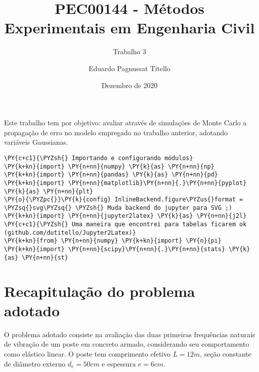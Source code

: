 

\author{Eduardo Pagnussat Titello}
\title{PEC00144 - Métodos Experimentais em Engenharia Civil}
\subtitle{Trabalho 3}
\date{Dezembro de 2020}



	
	\maketitle


Este trabalho tem por objetivo: avaliar através de simulações de Monte
Carlo a propagação de erro no modelo empregado no trabalho anterior,
adotando variáveis Gaussianas.

    \begin{tcolorbox}[breakable, size=fbox, boxrule=1pt, pad at break*=1mm,colback=cellbackground, colframe=cellborder]
\begin{Verbatim}[commandchars=\\\{\}]
\PY{c+c1}{\PYZsh{} Importando e configurando módulos}
\PY{k+kn}{import} \PY{n+nn}{numpy} \PY{k}{as} \PY{n+nn}{np}
\PY{k+kn}{import} \PY{n+nn}{pandas} \PY{k}{as} \PY{n+nn}{pd} 
\PY{k+kn}{import} \PY{n+nn}{matplotlib}\PY{n+nn}{.}\PY{n+nn}{pyplot} \PY{k}{as} \PY{n+nn}{plt}
\PY{o}{\PYZpc{}}\PY{k}{config} InlineBackend.figure\PYZus{}format = \PYZsq{}svg\PYZsq{} \PYZsh{} Muda backend do jupyter para SVG ;)
\PY{k+kn}{import} \PY{n+nn}{jupyter2latex} \PY{k}{as} \PY{n+nn}{j2l} \PY{c+c1}{\PYZsh{} Uma maneira que encontrei para tabelas ficarem ok (github.com/dutitello/Jupyter2Latex)}
\PY{k+kn}{from} \PY{n+nn}{numpy} \PY{k+kn}{import} \PY{n}{pi}
\PY{k+kn}{import} \PY{n+nn}{scipy}\PY{n+nn}{.}\PY{n+nn}{stats} \PY{k}{as} \PY{n+nn}{st}
\end{Verbatim}
\end{tcolorbox}

    \hypertarget{recapitulauxe7uxe3o-do-problema-adotado}{%
\section{Recapitulação do problema
adotado}\label{recapitulauxe7uxe3o-do-problema-adotado}}

O problema adotado consiste na avaliação das duas primeiras frequências
naturais de vibração de um poste em concreto armado, considerando seu
comportamento como elástico linear. O poste tem comprimento efetivo
\(L=12m\), seção constante de diâmetro externo \(d_e=50cm\) e espessura
\(e=6cm\).

